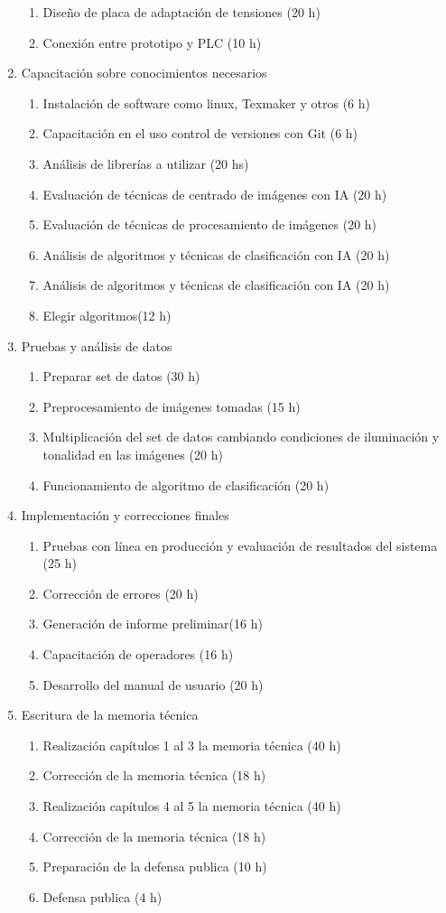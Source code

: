 \documentclass[11pt]{charter}
\begin{document}
\begin{enumerate}
\begin{enumerate}
	\item Diseño de placa de adaptación de tensiones (20 h)
	\item Conexión entre prototipo y PLC (10 h)
	\end{enumerate}
\item Capacitación sobre conocimientos necesarios
	\begin{enumerate}
	\item Instalación de software como linux, Texmaker y otros (6 h)
	\item Capacitación en el uso control de versiones con Git (6 h)
	\item Análisis de librerías a utilizar (20 hs)
	\item Evaluación de técnicas de centrado de imágenes con IA (20 h) 
	\item Evaluación de técnicas de procesamiento de imágenes (20 h)
	\item Análisis de algoritmos y técnicas de clasificación con IA (20 h)

	\item Análisis de algoritmos y técnicas de clasificación con IA (20 h)
	\item Elegir algoritmos(12 h)
	\end{enumerate}
\item Pruebas y análisis de datos
	\begin{enumerate}
	\item Preparar set de datos (30 h)
	\item Preprocesamiento de imágenes tomadas (15 h)
	\item Multiplicación del set de datos cambiando condiciones de iluminación y tonalidad en las imágenes (20 h)
	\item Funcionamiento de algoritmo de clasificación (20 h)
	\end{enumerate}
\item Implementación y correcciones finales
	\begin{enumerate}
	\item Pruebas con línea en producción y evaluación de resultados del sistema (25 h)
	\item Corrección de errores (20 h)
	\item Generación de informe preliminar(16 h)
	\item Capacitación de operadores (16 h)
	\item Desarrollo del manual de usuario (20 h)
	\end{enumerate}
\item Escritura de la memoria técnica
	\begin{enumerate}
	\item Realización capítulos 1 al 3 la memoria técnica (40 h) 
	\item Corrección de la memoria técnica (18 h)
	\item Realización capítulos 4 al 5 la memoria técnica (40 h)
	\item Corrección de la memoria técnica (18 h)
	\item Preparación de la defensa publica (10 h)
	\item Defensa publica (4 h)
	

\end{enumerate}
\end{enumerate}
\end{document}
